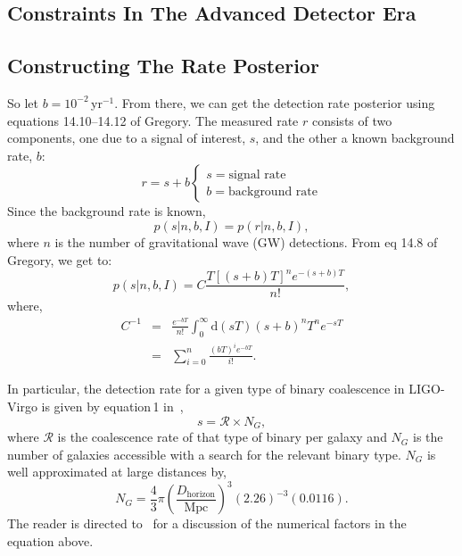 \documentclass[a0,landscape]{a0poster}
\newcommand{\cbcrate}{{{\mathcal R}}}
\newcommand{\diff}{{\mathrm d}}
\def\gw#1{gravitational wave#1 (GW#1)\gdef\gw{GW}}
\begin{document}
\begin{multicols}{4}
\section*{Constraints In The Advanced Detector Era}

\subsection*{Constructing The Rate Posterior}

So let $b=10^{-2}$\,yr$^{-1}$.  From there, we can get the detection rate
posterior using equations 14.10--14.12 of Gregory.  The measured rate $r$
consists of two components, one due to a signal of interest, $s$, and the other
a known background rate, $b$:
\begin{equation}
r = s + b
\begin{cases}
s = \text{signal rate} \\
b = \text{background rate}
\end{cases}
\end{equation}
%
Since the background rate is known,
\begin{equation}
p(s|n,b,I) = p(r|n,b,I),
\end{equation}
%
where $n$ is the number of \gw{} detections.  From eq 14.8 of Gregory, we get
to:
\begin{equation}
p(s|n,b,I) = C \frac{ T\left[(s+b)T\right]^n e^{-(s+b)T}}{n!},
\end{equation}
%
where,
\begin{eqnarray}
C^{-1} & = &\frac{e^{-bT}}{n!} \int_0^{\infty}\diff(sT)(s+b)^n T^n e^{-sT}\\
& = & \sum_{i=0}^n \frac{ (bT)^i e^{-bT}}{i!}.
\end{eqnarray}

In particular,  the detection rate for a given type of binary coalescence in
LIGO-Virgo is given by equation\,1 in~\cite{rates_paper},
\begin{equation}
s = \cbcrate \times N_G,
\end{equation}
%
where $\cbcrate$ is the coalescence rate of that type of binary per galaxy and
$N_G$ is the number of galaxies accessible with a search for the relevant binary
type.  $N_G$ is well approximated at large distances by,
%
\begin{equation}
N_G = \frac{4}{3} \pi \left( \frac{D_{\textrm{horizon}}}{\textrm{Mpc}}
\right)^3 (2.26)^{-3} (0.0116).
\end{equation}
%
The reader is directed to~\cite{rates_paper} for a discussion of the numerical
factors in the equation above.


\end{multicols}
\end{document}
